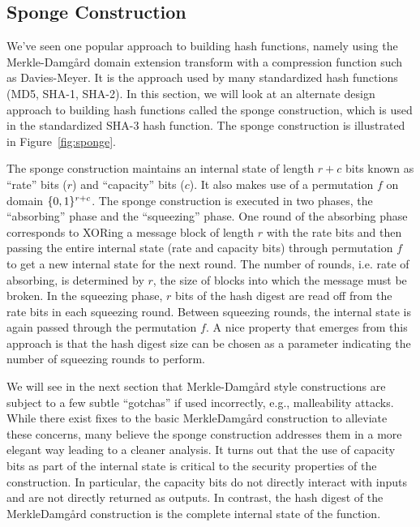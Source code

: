 \subsection{Sponge Construction}
We've seen one popular approach to building hash functions, namely using the Merkle-Damg\aa rd domain extension transform with a compression function such as Davies-Meyer.
It is the approach used by many standardized hash functions (MD5, SHA-1, SHA-2).
In this section, we will look at an alternate design approach to building hash functions called the sponge construction, which is used in the standardized SHA-3 hash function.
The sponge construction is illustrated in Figure~\ref{fig:sponge}.

The sponge construction maintains an internal state of length $r+c$ bits known as ``rate'' bits ($r$) and ``capacity'' bits ($c$).
It also makes use of a permutation $f$ on domain $\{0,1\}^{r+c}$.
The sponge construction is executed in two phases, the ``absorbing'' phase and the ``squeezing'' phase.
One round of the absorbing phase corresponds to XORing a message block of length $r$ with the rate bits and then passing the entire internal state (rate and capacity bits) through permutation $f$ to get a new internal state for the next round.
The number of rounds, i.e. rate of absorbing, is determined by $r$, the size of blocks into which the message must be broken.
In the squeezing phase, $r$ bits of the hash digest are read off from the rate bits in each squeezing round.
Between squeezing rounds, the internal state is again passed through the permutation $f$.
A nice property that emerges from this approach is that the hash digest size can be chosen as a parameter indicating the number of squeezing rounds to perform.

We will see in the next section that Merkle-Damg\aa rd style constructions are subject to a few subtle ``gotchas'' if used incorrectly, e.g., malleability attacks.
While there exist fixes to the basic Merkle\dash Damg\aa rd construction to alleviate these concerns, many believe the sponge construction addresses them in a more elegant way leading to a cleaner analysis.
It turns out that the use of capacity bits as part of the internal state is critical to the security properties of the construction.
In particular, the capacity bits do not directly interact with inputs and are not directly returned as outputs.
In contrast, the hash digest of the Merkle\dash Damg\aa rd construction is the complete internal state of the function.


